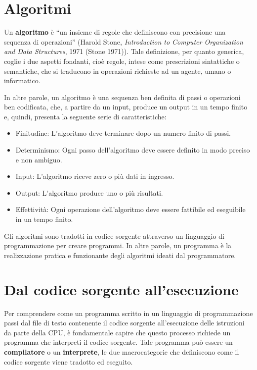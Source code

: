 \documentclass[
  letterpaper,
]{scrbook}
\begin{document}
\section{Algoritmi}\label{algoritmi}

Un \textbf{algoritmo} è ``un insieme di regole che definiscono con
precisione una sequenza di operazioni'' (Harold Stone,
\emph{Introduction to Computer Organization and Data Structures}, 1971
(Stone 1971)). Tale definizione, per quanto generica, coglie i due
aspetti fondanti, cioè regole, intese come prescrizioni sintattiche o
semantiche, che si traducono in operazioni richieste ad un agente, umano
o informatico.

In altre parole, un algoritmo è una sequenza ben definita di passi o
operazioni ben codificata, che, a partire da un input, produce un output
in un tempo finito e, quindi, presenta la seguente serie di
caratteristiche:

\begin{itemize}
\item
  Finitudine: L'algoritmo deve terminare dopo un numero finito di passi.
\item
  Determinismo: Ogni passo dell'algoritmo deve essere definito in modo
  preciso e non ambiguo.
\item
  Input: L'algoritmo riceve zero o più dati in ingresso.
\item
  Output: L'algoritmo produce uno o più risultati.
\item
  Effettività: Ogni operazione dell'algoritmo deve essere fattibile ed
  eseguibile in un tempo finito.
\end{itemize}

Gli algoritmi sono tradotti in codice sorgente attraverso un linguaggio
di programmazione per creare programmi. In altre parole, un programma è
la realizzazione pratica e funzionante degli algoritmi ideati dal
programmatore.

\section{Dal codice sorgente
all'esecuzione}\label{dal-codice-sorgente-allesecuzione}

Per comprendere come un programma scritto in un linguaggio di
programmazione passi dal file di testo contenente il codice sorgente
all'esecuzione delle istruzioni da parte della CPU, è fondamentale
capire che questo processo richiede un programma che interpreti il
codice sorgente. Tale programma può essere un \textbf{compilatore} o un
\textbf{interprete}, le due macrocategorie che definiscono come il
codice sorgente viene tradotto ed eseguito.
\end{document}
